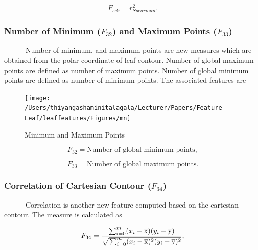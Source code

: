 \documentclass{article}
\begin{document}
\begin{equation}
    F_{sc9} = r^2_{Spearman}.
\end{equation}

\hypertarget{number-of-minimum-f_32-and-maximum-points-f_33}{%
\subsubsection{\texorpdfstring{Number of Minimum (\(F_{32}\)) and
Maximum Points
(\(F_{33}\))}{Number of Minimum (F\_\{32\}) and Maximum Points (F\_\{33\})}}\label{number-of-minimum-f_32-and-maximum-points-f_33}}

~~~~~~Number of minimum, and maximum points are new measures which are
obtained from the polar coordinate of leaf contour. Number of global
maximum points are defined as number of maximum points. Number of global
minimum points are defined as number of minimum points. The associated
features are

\begin{figure}[!ht]

{\centering \texttt{[image: /Users/thiyangashaminitalagala/Lecturer/Papers/Feature-Leaf/leaffeatures/Figures/mn]} 

}

\caption{\label{mn}Minimum and Maximum Points}\label{fig:unnamed-chunk-34}
\end{figure}

\begin{equation}
   F_{32} =  \text{Number of global minimum points},
\label{equa_F8}
\end{equation}

\begin{equation}
   F_{33} =  \text{Number of global maximum points}.
\label{equa_F9}
\end{equation}

\hypertarget{correlation-of-cartesian-contour-f_34}{%
\subsubsection{\texorpdfstring{Correlation of Cartesian Contour
(\(F_{34}\))}{Correlation of Cartesian Contour (F\_\{34\})}}\label{correlation-of-cartesian-contour-f_34}}

~~~~~~Correlation is another new feature computed based on the cartesian
contour. The measure is calculated as

\begin{equation}
   F_{34} =  \frac{\sum_{i=0}^{m}(x_i - \overline{\rm x})(y_i - \overline{\rm y})}{\sqrt{\sum_{i=0}^{m} (x_i - \overline{\rm x})^2 (y_i - \overline{\rm y})^2}},
\label{equa_F10}
\end{equation}
\end{document}
